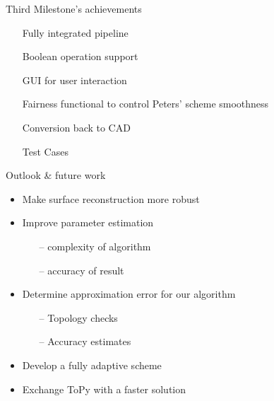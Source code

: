 \begin{frame}{Third Milestone's achievements}



\begin{itemize}
	\item[\textcolor{green}{\Checkmark}] Fully integrated pipeline 
	
	\item[\textcolor{green}
	{\Checkmark}] Boolean operation support
		
	\item[\textcolor{green}
	{\Checkmark}] GUI for user interaction
	
	\item[\textcolor{green}
	{\Checkmark}] Fairness functional to control Peters' scheme smoothness
	
		\item[\textcolor{green}
	{\Checkmark}] Conversion back to CAD
	
	\item[\textcolor{green}
	{\Checkmark}] Test Cases


\end{itemize}

\end{frame}

\begin{frame}{Outlook \& future work}
\begin{itemize}
\item Make surface reconstruction more robust
\item Improve parameter estimation
\begin{itemize}
\item[--] complexity of algorithm 
\item[--] accuracy of result
\end{itemize}
\item Determine approximation error for our algorithm
\begin{itemize}
\item[--] Topology checks
\item[--] Accuracy estimates
\end{itemize}
\item Develop a fully adaptive scheme
\item Exchange ToPy with a faster solution
\end{itemize}
\end{frame}






